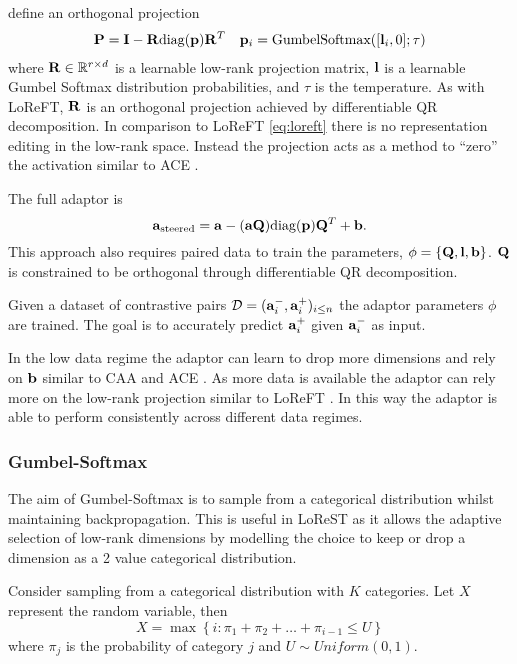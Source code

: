 \citet{steering-clear} define an orthogonal projection
\begin{align*}
    \mathbf{P} = \mathbf{I} - \mathbf{R}\text{diag}(\mathbf{p})\mathbf{R}^T && \mathbf{p}_i = \text{GumbelSoftmax}([\mathbf{l}_i,0];\tau)
\end{align*}
where $\mathbf{R} \in \mathbb{R}^{r\times d}$ is a learnable low-rank projection matrix, $\mathbf{l}$ is a learnable Gumbel Softmax distribution probabilities, and $\tau$ is the temperature.
As with LoReFT, $\mathbf{R}$ is an orthogonal projection achieved by differentiable QR decomposition.
In comparison to LoReFT \cref{eq:loreft} there is no representation editing in the low-rank space.
Instead the projection acts as a method to ``zero'' the activation similar to ACE \citep{ace}.

The full adaptor is
\begin{equation}
    \mathbf{a}_\text{steered} = \mathbf{a} - (\mathbf{a}\mathbf{Q})\text{diag}(\mathbf{p})\mathbf{Q}^T + \mathbf{b}.
\end{equation}
This approach also requires paired data to train the parameters, $\phi = \{\mathbf{Q}, \mathbf{l}, \mathbf{b}\}$.
$\mathbf{Q}$ is constrained to be orthogonal through differentiable QR decomposition.

Given a dataset of contrastive pairs $\mathcal{D} = (\mathbf{a}_i^-, \mathbf{a}_i^+)_{i\le n}$ the adaptor parameters $\phi$ are trained.
The goal is to accurately predict $\mathbf{a}_i^+$ given $\mathbf{a}_i^-$ as input.

In the low data regime the adaptor can learn to drop more dimensions and rely on $\mathbf{b}$ similar to CAA \citep{caa} and ACE \citep{ace}.
As more data is available the adaptor can rely more on the low-rank projection similar to LoReFT \citep{reft}.
In this way the adaptor is able to perform consistently across different data regimes.

\subsubsection{Gumbel-Softmax}

The aim of Gumbel-Softmax is to sample from a categorical distribution whilst maintaining backpropagation.
This is useful in LoReST as it allows the adaptive selection of low-rank dimensions by modelling the choice to keep or drop a dimension as a 2 value categorical distribution.

Consider sampling from a categorical distribution with $K$ categories.
Let $X$ represent the random variable, then
\begin{equation*}
    X = \max\left\{i : \pi_1 + \pi_2 + \dots + \pi_{i-1} \le U\right\}
\end{equation*}
where $\pi_j$ is the probability of category $j$ and $U \sim Uniform(0,1)$.

